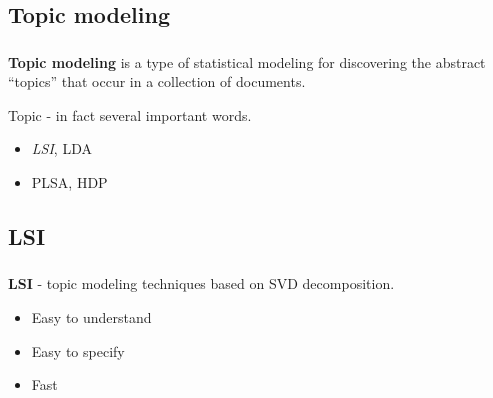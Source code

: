 \documentclass[t, 11pt]{beamer}
\begin{document}
\subsection{Topic modeling}
\begin{frame}
	\frametitle{\insertsection}
	\frametitle{\insertsubsection}  
	\textbf{Topic modeling} is a type of statistical modeling for discovering the abstract “topics” that occur in a collection of documents.
	 
	\vspace{0.5cm}
	
	Topic - in fact several important words.
	
	\vspace{0.5cm}
	
	\begin{itemize}
	\item \emph{LSI}, LDA
	\item PLSA, HDP
\end{itemize}
	
\end{frame}

\subsection{LSI}
\begin{frame}
	\frametitle{\insertsection}
	\frametitle{\insertsubsection}  
	\textbf{LSI} - topic modeling techniques based on SVD decomposition. 
	
	\vspace{0.5cm}
	
	\begin{itemize}
	\item Easy to understand
	\item Easy to specify
	\item Fast
\end{itemize}	
	\vspace{0.5cm}

\end{frame}
\end{document}
